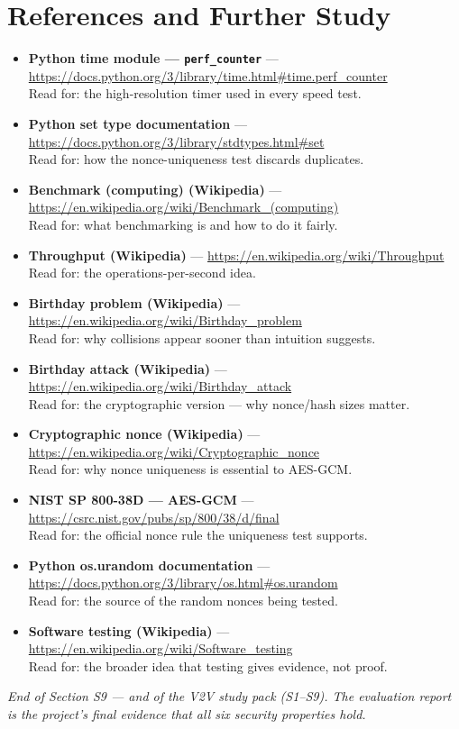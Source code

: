 \documentclass[11pt,a4paper]{article}
\begin{document}
\section{References and Further Study}
\begin{itemize}
  \item \textbf{Python time module --- \texttt{perf\_counter}} ---
        \url{https://docs.python.org/3/library/time.html#time.perf_counter}\\
        Read for: the high-resolution timer used in every speed test.
  \item \textbf{Python set type documentation} ---
        \url{https://docs.python.org/3/library/stdtypes.html#set}\\
        Read for: how the nonce-uniqueness test discards duplicates.
  \item \textbf{Benchmark (computing) (Wikipedia)} ---
        \url{https://en.wikipedia.org/wiki/Benchmark_(computing)}\\
        Read for: what benchmarking is and how to do it fairly.
  \item \textbf{Throughput (Wikipedia)} ---
        \url{https://en.wikipedia.org/wiki/Throughput}\\
        Read for: the operations-per-second idea.
  \item \textbf{Birthday problem (Wikipedia)} ---
        \url{https://en.wikipedia.org/wiki/Birthday_problem}\\
        Read for: why collisions appear sooner than intuition suggests.
  \item \textbf{Birthday attack (Wikipedia)} ---
        \url{https://en.wikipedia.org/wiki/Birthday_attack}\\
        Read for: the cryptographic version --- why nonce/hash sizes matter.
  \item \textbf{Cryptographic nonce (Wikipedia)} ---
        \url{https://en.wikipedia.org/wiki/Cryptographic_nonce}\\
        Read for: why nonce uniqueness is essential to AES-GCM.
  \item \textbf{NIST SP 800-38D --- AES-GCM} ---
        \url{https://csrc.nist.gov/pubs/sp/800/38/d/final}\\
        Read for: the official nonce rule the uniqueness test supports.
  \item \textbf{Python os.urandom documentation} ---
        \url{https://docs.python.org/3/library/os.html#os.urandom}\\
        Read for: the source of the random nonces being tested.
  \item \textbf{Software testing (Wikipedia)} ---
        \url{https://en.wikipedia.org/wiki/Software_testing}\\
        Read for: the broader idea that testing gives evidence, not proof.
\end{itemize}

\vfill
\begin{center}\footnotesize\itshape
End of Section S9 --- and of the V2V study pack (S1--S9). The evaluation report
is the project's final evidence that all six security properties hold.
\end{center}
\end{document}
